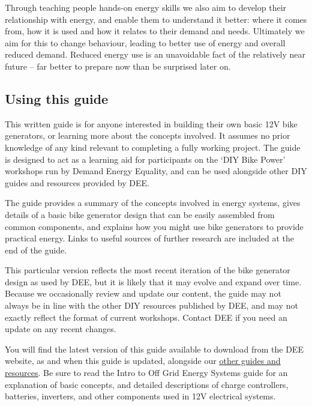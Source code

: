 \documentclass{article}
\theoremstyle{definition}
\theoremstyle{definition}
\theoremstyle{remark}
\begin{document}
    Through teaching people hands-on energy skills we also aim to develop their relationship with energy, and enable them to understand it better: where it comes from, how it is used and how it relates to their demand and needs. Ultimately we aim for this to change behaviour, leading to better use of energy and overall reduced demand. Reduced energy use is an unavoidable fact of the relatively near future – far better to prepare now than be surprised later on.

  
  {\color{blue}\subsection{Using this guide}} %
  \label{sub:using_this_guide}

    This written guide is for anyone interested in building their own basic 12V bike generators, or learning more about the concepts involved. It assumes no prior knowledge of any kind relevant to completing a fully working project. The guide is designed to act as a learning aid for participants on the ‘DIY Bike Power’ workshops run by Demand Energy Equality, and can be used alongside other DIY guides and resources provided by DEE. 

    The guide provides a summary of the concepts involved in energy systems, gives details of a basic bike generator design that can be easily assembled from common components, and explains how you might use bike generators to provide practical energy. Links to useful sources of further research are included at the end of the guide.

    This particular version reflects the most recent iteration of the bike generator design as used by DEE, but it is likely that it may evolve and expand over time. Because we occasionally review and update our content, the guide may not always be in line with the other DIY resources published by DEE, and may not exactly reflect the format of current workshops. Contact DEE if you need an update on any recent changes. 
    
    You will find the latest version of this guide available to download from the DEE website, as and when this guide is updated, alongside our \href{https://www.demandenergyequality.org/resources/}{\underline{other guides and resources}}. Be sure to read the Intro to Off Grid Energy Systems guide for an explanation of basic concepts, and detailed descriptions of charge controllers, batteries, inverters, and other components used in 12V electrical systems.
\end{document}
